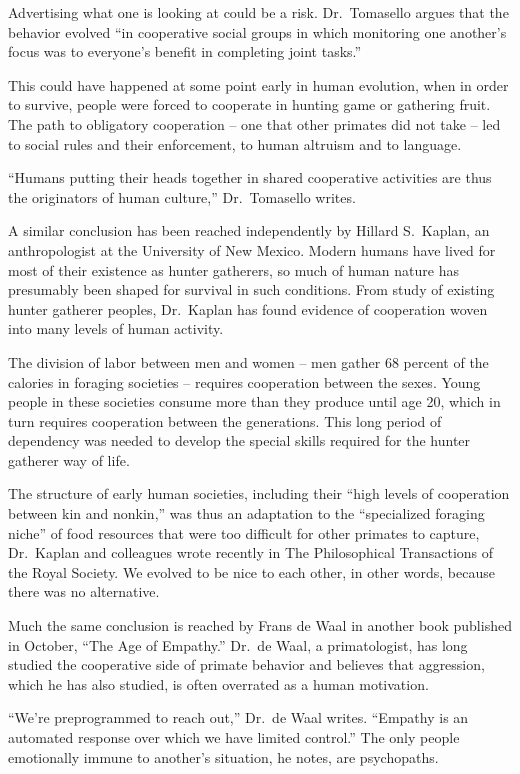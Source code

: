 ﻿\documentclass[12pt]{article}
\begin{document}
Advertising what one is looking at could be a risk. Dr.~Tomasello argues that the behavior evolved
``in cooperative social groups in which monitoring one another's focus was to everyone's benefit in
completing joint tasks.''

This could have happened at some point early in human evolution, when in order to survive, people
were forced to cooperate in hunting game or gathering fruit. The path to obligatory cooperation --
one that other primates did not take -- led to social rules and their enforcement, to human altruism
and to language.

``Humans putting their heads together in shared cooperative activities are thus the originators of
human culture,'' Dr.~Tomasello writes.

A similar conclusion has been reached independently by Hillard S.~Kaplan, an anthropologist at the
University of New Mexico. Modern humans have lived for most of their existence as hunter gatherers,
so much of human nature has presumably been shaped for survival in such conditions. From study of
existing hunter gatherer peoples, Dr.~Kaplan has found evidence of cooperation woven into many
levels of human activity.

The division of labor between men and women -- men gather 68 percent of the calories in foraging
societies -- requires cooperation between the sexes. Young people in these societies consume more
than they produce until age 20, which in turn requires cooperation between the generations. This
long period of dependency was needed to develop the special skills required for the hunter gatherer
way of life.

The structure of early human societies, including their ``high levels of cooperation between kin and
nonkin,'' was thus an adaptation to the ``specialized foraging niche'' of food resources that were
too difficult for other primates to capture, Dr.~Kaplan and colleagues wrote recently in The
Philosophical Transactions of the Royal Society. We evolved to be nice to each other, in other
words, because there was no alternative.

Much the same conclusion is reached by Frans de Waal in another book published in October, ``The Age
of Empathy.'' Dr.~de Waal, a primatologist, has long studied the cooperative side of primate
behavior and believes that aggression, which he has also studied, is often overrated as a human
motivation.

``We're preprogrammed to reach out,'' Dr.~de Waal writes. ``Empathy is an automated response over
which we have limited control.'' The only people emotionally immune to another's situation, he
notes, are psychopaths.
\end{document}

